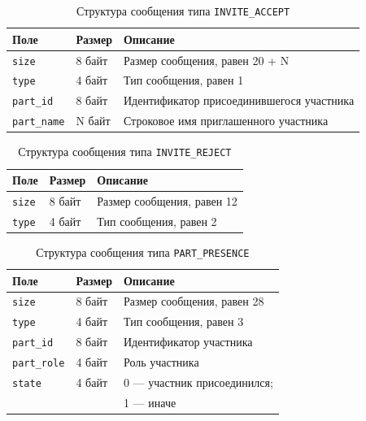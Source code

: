 \begin{table}[H]
  \centering
  \caption{Структура сообщения типа \texttt{INVITE\_ACCEPT}}
  \label{tbl:msg:invite-accept}
  \begin{tabular}{|l|l|l|}
    \hline
    \textbf{Поле} & \textbf{Размер} & \textbf{Описание} \\ \hline
    \texttt{size} & 8 байт & Размер сообщения, равен 20 + N \\ \hline
    \texttt{type} & 4 байт & Тип сообщения, равен 1 \\ \hline
    \texttt{part\_id} & 8 байт & Идентификатор присоединившегося участника \\ \hline
    \texttt{part\_name} & N байт & Строковое имя приглашенного участника \\ \hline
  \end{tabular}
\end{table}

\begin{table}[H]
  \centering
  \caption{Структура сообщения типа \texttt{INVITE\_REJECT}}
  \label{tbl:msg:invite-reject}
  \begin{tabular}{|l|l|l|}
    \hline
    \textbf{Поле} & \textbf{Размер} & \textbf{Описание} \\ \hline
    \texttt{size} & 8 байт & Размер сообщения, равен 12 \\ \hline
    \texttt{type} & 4 байт & Тип сообщения, равен 2 \\ \hline
  \end{tabular}
\end{table}

\begin{table}[H]
  \centering
  \caption{Структура сообщения типа \texttt{PART\_PRESENCE}}
  \label{tbl:msg:part-presence}
  \begin{tabular}{|l|l|l|}
    \hline
    \textbf{Поле} & \textbf{Размер} & \textbf{Описание} \\ \hline
    \texttt{size} & 8 байт & Размер сообщения, равен 28 \\ \hline
    \texttt{type} & 4 байт & Тип сообщения, равен 3 \\ \hline
    \texttt{part\_id} & 8 байт & Идентификатор участника \\ \hline
    \texttt{part\_role} & 4 байт & Роль участника \\ \hline
    \texttt{state} & 4 байт & 0 --- участник присоединился; \\
    & & 1 --- иначе \\ \hline
  \end{tabular}
\end{table}


